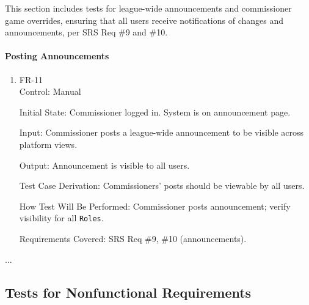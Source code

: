 \documentclass[12pt, titlepage]{article}
\begin{document}
This section includes tests for league-wide announcements and commissioner game overrides, ensuring that all users receive notifications of changes and announcements, per SRS Req \#9 and \#10.

\paragraph{Posting Announcements}

\begin{enumerate}

\item{FR-11\\}
Control: Manual

Initial State: Commissioner logged in. System is on announcement page.

Input: Commissioner posts a league-wide announcement to be visible across platform views.

Output: Announcement is visible to all users.

Test Case Derivation: Commissioners' posts should be viewable by all users.

How Test Will Be Performed: Commissioner posts announcement; verify visibility for all \texttt{Roles}.

Requirements Covered: SRS Req \#9, \#10 (announcements).
\end{enumerate}

...

\subsection{Tests for Nonfunctional Requirements}



\end{document}

